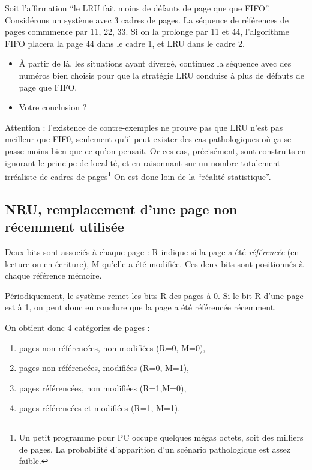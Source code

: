 \begin{multicols}{2}
\begin{exercice} Soit l'affirmation ``le LRU fait moins de défauts de page que que FIFO''.
Considérons un système avec 3 cadres de pages. La séquence de
références de pages commmence par 11, 22, 33. Si on la prolonge par 11
et 44, l'algorithme FIFO placera la page 44 dans le cadre 1, et LRU
dans le cadre 2.
\begin{itemize}
\item 
À partir de là, les situations ayant divergé, continuez la séquence
avec des numéros bien choisis pour que la stratégie LRU conduise à
plus de défauts de page que FIFO.
\item Votre conclusion ?
\end{itemize}
\end{exercice}

Attention : l'existence de contre-exemples ne prouve pas que LRU n'est
pas meilleur que FIF0, seulement qu'il peut exister des cas
pathologiques où ça se passe moins bien que ce qu'on pensait. Or ces
cas, précisément, sont construits en ignorant le principe de localité,
et en raisonnant sur un nombre totalement irréaliste de cadres de
pages\footnote{Un petit programme pour PC occupe quelques mégas
  octets, soit des milliers de pages. La probabilité d'apparition d'un
  scénario pathologique est assez faible.} On est donc loin de la
``réalité statistique''.


\subsection{NRU, remplacement d'une page non récemment utilisée}

Deux bits sont associés à chaque page : R  indique si la page a été
{\em référencée} (en lecture ou en écriture), M qu'elle a été modifiée.
Ces deux bits sont positionnés à chaque référence mémoire.

Périodiquement, le système remet les bits R des pages à 0.  Si le bit
R d'une page est à 1, on peut donc en conclure que la page a été
référencée récemment.

On obtient donc 4 catégories de pages :
\begin{enumerate}
\item pages non référencées, non modifiées (R=0, M=0),
\item pages non référencées, modifiées (R=0, M=1),
\item pages référencées, non modifiées (R=1,M=0),
\item pages référencées et modifiées (R=1, M=1).
\end{enumerate}


\end{multicols}

